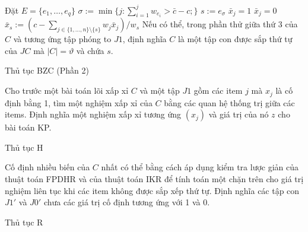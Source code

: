 \begin{algorithm}[H]
    \Else
    {
        Đặt $E = \{e_1, \dots, e_q\}$\;
        $\sigma := \min\{j:\sum_{i=1}^jw_{e_i} > \bar{c} -c ;\}$\;
        $s:= e_\sigma$\;
        {
            $\bar{x}_j = 1$\;
        }
        {
            $\bar{x}_j = 0$\;
        }
        $\bar{x}_s := (c - \sum_{j \in \{1, \dots, n\} \setminus \{s\}}w_j\bar{x}_j)/w_s$\;
        Nếu có thể, trong phần thử giữa thứ 3 của $C$ và tương ứng tập phóng to $J1$, định nghĩa $C$ là một tập con được sắp thứ tự của $JC$ mà $|C| = \vartheta$ và chứa $s$.
    }
    \caption{Thủ tục BZC (Phần 2)}
    \label{algo:bzc_part2}
\end{algorithm}


\begin{algorithm}[H]
    \DontPrintSemicolon
    \vspace{1em}
    \vspace{1em}
    Cho trước một bài toán lõi xấp xỉ $C$ và một tập $J1$ gồm các item $j$ mà $x_j$ là cố định bằng 1, tìm một nghiệm xấp xỉ của $C$ bằng các quan hệ thống trị giữa các items.\;
    Định nghĩa một nghiệm xấp xỉ tương ứng $(x_j)$ và giá trị của nó $z$ cho bài toán KP.\;
    \caption{Thủ tục H}
    \label{algo:h}
\end{algorithm}


\begin{algorithm}[H]
    \DontPrintSemicolon
    \vspace{1em}
    \vspace{1em}
    Cố định nhiều biến của $C$ nhất có thể bằng cách áp dụng kiểm tra lược giản của thuật toán FPDHR và của thuật toán IKR để tính toán một chặn trên cho giá trị nghiệm liên tục khi các item không được sắp xếp thứ tự.\;
    Định nghĩa các tập con $J1'$ và $J0'$ chưa các giá trị cố định tương ứng với 1 và 0.\;
    \caption{Thủ tục R}
    \label{algo:r}
\end{algorithm}


